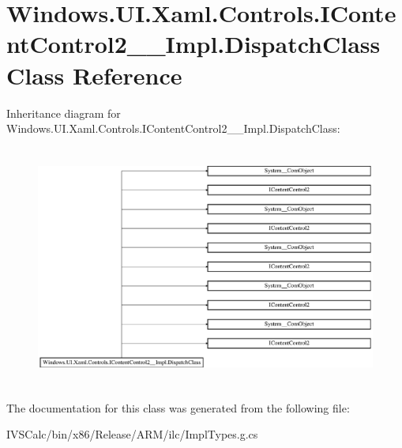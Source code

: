 \hypertarget{class_windows_1_1_u_i_1_1_xaml_1_1_controls_1_1_i_content_control2_____impl_1_1_dispatch_class}{}\section{Windows.\+U\+I.\+Xaml.\+Controls.\+I\+Content\+Control2\+\_\+\+\_\+\+Impl.\+Dispatch\+Class Class Reference}
\label{class_windows_1_1_u_i_1_1_xaml_1_1_controls_1_1_i_content_control2_____impl_1_1_dispatch_class}
Inheritance diagram for Windows.\+U\+I.\+Xaml.\+Controls.\+I\+Content\+Control2\+\_\+\+\_\+\+Impl.\+Dispatch\+Class\+:\begin{figure}[H]
\begin{center}
\leavevmode
\includegraphics[height=7.979275cm]{class_windows_1_1_u_i_1_1_xaml_1_1_controls_1_1_i_content_control2_____impl_1_1_dispatch_class}
\end{center}
\end{figure}


The documentation for this class was generated from the following file\+:\begin{DoxyCompactItemize}
\item 
I\+V\+S\+Calc/bin/x86/\+Release/\+A\+R\+M/ilc/Impl\+Types.\+g.\+cs\end{DoxyCompactItemize}
